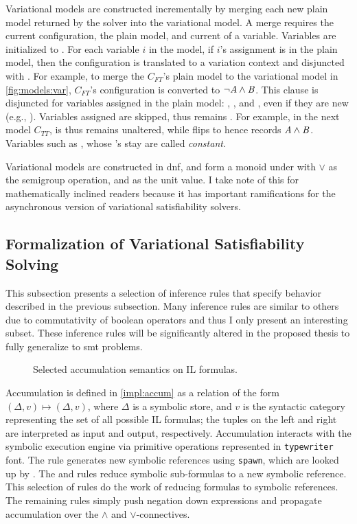 Variational models are constructed incrementally by merging each new plain model
returned by the solver into the variational model. A merge requires the current
configuration, the plain model, and current \vc{} of a variable. Variables are
initialized to \fls{}. For each variable $i$ in the model, if $i$'s assignment
is \tru{} in the plain model, then the configuration is translated to a
variation context and disjuncted with . For example, to merge the
$C_{FT}$'s plain model to the variational model in \autoref{fig:models:var},
$C_{FT}$'s configuration is converted to $\neg \mathit{A}{} \wedge \mathit{B}{}$. This clause
is disjuncted for variables assigned \tru{} in the plain model: \vc{\aV{}},
\vc{\cV{}}, and \vc{\pV{}}, even if they are new (e.g., \cV{}). Variables
assigned \fls{} are skipped, thus \vc{\qV{}} remains \fls{}. For example, in the
next model $C_{TT}$, \cV{} is \fls{} thus \vc{\cV{}} remains unaltered, while
\vc{\qV{}} flips to \tru{} hence \vc{\qV{}} records $\mathit{A}{} \wedge \mathit{B}{}$.
Variables such as \bV{}, whose \vc{}'s stay \fls{} are called \textit{constant}.


Variational models are constructed in \ac{dnf}, and form a monoid under with
$\vee$ as the semigroup operation, and \fls{} as the unit value. I take note of
this for mathematically inclined readers because it has important ramifications
for the asynchronous version of variational satisfiability solvers.

\subsection{Formalization of Variational Satisfiability Solving}
This subsection presents a selection of inference rules that specify behavior
described in the previous subsection. Many inference rules are similar to others
due to commutativity of boolean operators and thus I only present an interesting
subset. These inference rules will be significantly altered in the proposed
thesis to fully generalize to \ac{smt} problems.

\begin{figure}
  
  \caption{Selected accumulation semantics on IL formulas.}%
  \label{impl:accum}
\end{figure}

Accumulation is defined in \autoref{impl:accum} as a relation of the form
$(\Delta,v)\mapsto(\Delta,v)$, where $\Delta$ is a symbolic store, and $v$ is
the syntactic category representing the set of all possible IL formulas; the
tuples on the left and right are interpreted as input and output, respectively.
Accumulation interacts with the symbolic execution engine via primitive
operations represented in \texttt{typewriter} font.
%
The  rule generates new symbolic references using \texttt{spawn},
which are looked up by . The  and  rules
reduce symbolic sub-formulas to a new symbolic reference.
%
This selection of rules do the work of reducing formulas to symbolic references.
The remaining rules simply push negation down expressions and propagate
accumulation over the $\wedge$ and $\vee$-connectives.

